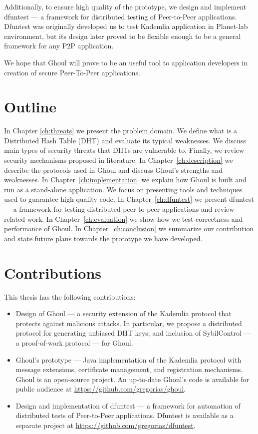 Additionally, to ensure high quality of the prototype, we design and implement
dfuntest --- a framework for distributed testing of Peer-to-Peer applications.
Dfuntest was originally developed us to test Kademlia application in Planet-lab
environment, but its design later proved to be flexible enough to be a general
framework for any P2P application.

We hope that Ghoul will prove to be an useful tool to application developers in
creation of secure Peer-To-Peer applications.

\section{Outline}
In Chapter \ref{ch:threats} we present the problem domain.
We define what is a Distributed Hash Table (DHT) and evaluate its typical
weaknesses.
We discuss main types of security threats that DHTs are vulnerable to.
Finally, we review security mechanisms proposed in literature.
In Chapter~\ref{ch:description} we describe the protocols used in Ghoul and
discuss Ghoul's strengths and weaknesses.
In Chapter~\ref{ch:implementation} we explain how Ghoul is built and run as a
stand-alone application.
We focus on presenting tools and techniques used to guarantee high-quality code.
In Chapter~\ref{ch:dfuntest} we present dfuntest --- a framework for testing
distributed peer-to-peer applications and review related work.
In Chapter~\ref{ch:evaluation} we show how we test correctness and
performance of Ghoul.
In Chapter~\ref{ch:conclusion} we summarize our contribution and state future
plans towards the prototype we have developed.

\section{Contributions}
This thesis has the following contributions:
\begin{itemize}
  \item Design of Ghoul --- a security extension of the Kademlia protocol that
    protects against malicious attacks.
    In particular, we propose a distributed protocol for generating unbiased DHT
    keys; and inclusion of SybilControl --- a proof-of-work protocol --- for
    Ghoul.
  \item Ghoul's prototype --- Java implementation of the Kademlia protocol with
    message extensions, certificate management, and registration mechanisms.
    Ghoul is an open-source project.
    An up-to-date Ghoul's code is available for public audience at \url{https://github.com/gregorias/ghoul}.
  \item Design and implementation of dfuntest --- a framework for automation of
    distributed tests of Peer-to-Peer applications.
    Dfuntest is available as a separate project at
    \url{https://github.com/gregorias/dfuntest}.
\end{itemize}
